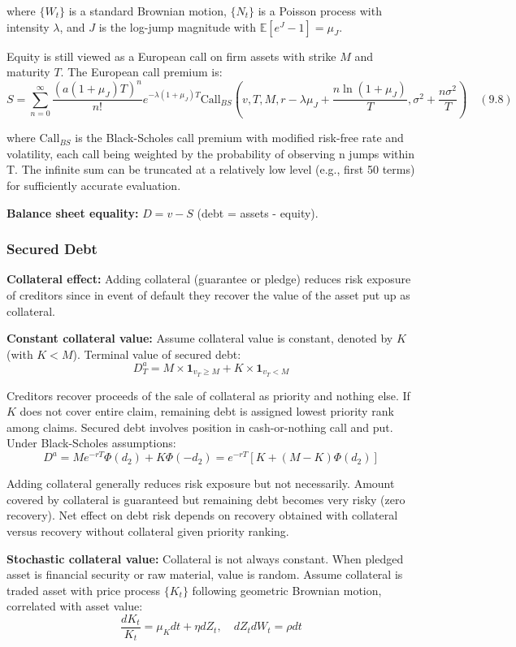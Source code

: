 \documentclass[12pt,a4paper]{article}
\begin{document}
where $\{W_t\}$ is a standard Brownian motion, $\{N_t\}$ is a Poisson process with intensity $\lambda$, and $J$ is the log-jump magnitude with $\mathbb{E}[e^J - 1] = \mu_J$.

Equity is still viewed as a European call on firm assets with strike $M$ and maturity $T$. The European call premium is:
$$S = \sum_{n=0}^{\infty} \frac{(a(1+\mu_J)T)^n}{n!}e^{-\lambda(1+\mu_J)T}\text{Call}_{BS}\left(v, T, M, r -\lambda \mu_J + \frac{n\ln(1+\mu_J)}{T}, \sigma^2 + \frac{n\sigma^2}{T}\right) \quad (9.8)$$

where $\text{Call}_{BS}$ is the Black-Scholes call premium  with modified risk-free rate and volatility, each call being weighted by the 
probability of observing n jumps within T. The infinite sum can be truncated at a relatively low level (e.g., first 50 terms) for sufficiently accurate evaluation.

\textbf{Balance sheet equality:} $D = v - S$ (debt = assets - equity).

\subsubsection{Secured Debt}

\textbf{Collateral effect:} Adding collateral (guarantee or pledge) reduces risk exposure of creditors since in event of default they recover the value of the asset put up as collateral.

\textbf{Constant collateral value:} Assume collateral value is constant, denoted by $K$ (with $K < M$). Terminal value of secured debt:
$$D_T^a = M \times \mathbf{1}_{v_T \geq M} + K \times \mathbf{1}_{v_T < M}$$

Creditors recover proceeds of the sale of collateral as priority and nothing else. If $K$ does not cover entire claim, remaining debt is assigned lowest priority rank among claims. Secured debt involves position in cash-or-nothing call and put. Under Black-Scholes assumptions:
$$D^a = Me^{-rT}\Phi(d_2) + K\Phi(-d_2) = e^{-rT}[K + (M-K)\Phi(d_2)]$$

Adding collateral generally reduces risk exposure but not necessarily. Amount covered by collateral is guaranteed but remaining debt becomes very risky (zero recovery). Net effect on debt risk depends on recovery obtained with collateral versus recovery without collateral given priority ranking.

\textbf{Stochastic collateral value:} Collateral is not always constant. When pledged asset is financial security or raw material, value is random. Assume collateral is traded asset with price process $\{K_t\}$ following geometric Brownian motion, correlated with asset value:
$$\frac{dK_t}{K_t} = \mu_K dt + \eta dZ_t, \quad dZ_t dW_t = \rho dt$$
\end{document}
